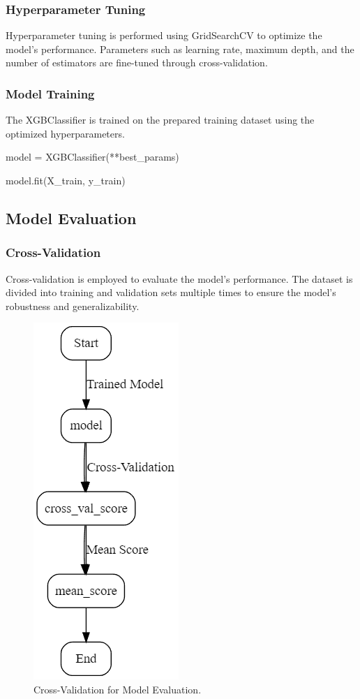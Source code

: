 \documentclass[conference]{IEEEtran}
\begin{document}
\subsubsection{Hyperparameter Tuning}
Hyperparameter tuning is performed using GridSearchCV to optimize the model's performance. Parameters such as learning rate, maximum depth, and the number of estimators are fine-tuned through cross-validation.




\subsubsection{Model Training}
The XGBClassifier is trained on the prepared training dataset using the optimized hyperparameters.

model = XGBClassifier(**best\_params)

model.fit(X\_train, y\_train)


\subsection{Model Evaluation}

\subsubsection{Cross-Validation}
Cross-validation is employed to evaluate the model’s performance. The dataset is divided into training and validation sets multiple times to ensure the model’s robustness and generalizability.

\begin{figure}[H]
    \centerline{\includegraphics[width=0.35\linewidth]{fig4.png}}
    \caption{Cross-Validation for Model Evaluation.}
    \label{fig4}
\end{figure}
\end{document}
